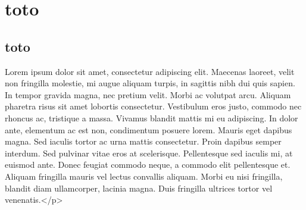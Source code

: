 \documentclass[a4paper, oneside, notitlepage, 12pt]{article}
\title{}
\date{}
\author{}
\begin{document}
\makeatletter
\def\toto#1{\subsection{#1}}
\def\@sect#1#2#3#4#5#6[#7]#8{%
  \let\edtext=\dummy@edtext\ifnum #2>\c@secnumdepth
    \let\@svsec\@empty
  \else
    \refstepcounter{#1}%
    \protected@edef\@svsec{\@seccntformat{#1}\relax}%
  \fi
  \@tempskipa #5\relax
  \ifdim \@tempskipa>\z@
    \begingroup
      #6{%
        \@hangfrom{\hskip #3\global\advance\line@num 1\llap{\leftlinenum} \relax\@svsec}%
          \interlinepenalty \@M #8\@@par}%
    \endgroup
    \csname #1mark\endcsname{#7}%
    \addcontentsline{toc}{#1}{%
      \ifnum #2>\c@secnumdepth \else
        \protect\numberline{\csname the#1\endcsname}%
      \fi
      #7}%
  \else
    \def\@svsechd{%
      #6{\hskip #3\relax
      \@svsec #8}%
      \csname #1mark\endcsname{#7}%
      \addcontentsline{toc}{#1}{%
        \ifnum #2>\c@secnumdepth \else
          \protect\numberline{\csname the#1\endcsname}%
        \fi
        #7}}%
  \fi
  \@xsect{#5}}

\beginnumbering

\pstart

\section{toto}
\subsection{toto}
Lorem ipsum dolor sit amet, consectetur adipiscing elit. Maecenas laoreet, velit non fringilla molestie, mi augue aliquam turpis, in sagittis nibh dui quis sapien. In tempor gravida magna, nec pretium velit. Morbi ac volutpat arcu. Aliquam pharetra risus sit amet lobortis consectetur. Vestibulum eros justo, commodo nec rhoncus ac, tristique a massa. Vivamus blandit mattis mi eu adipiscing. In dolor ante, elementum ac est non, condimentum posuere lorem. Mauris eget dapibus magna. Sed iaculis tortor ac urna mattis consectetur. Proin dapibus semper interdum. Sed pulvinar vitae eros at scelerisque. Pellentesque sed iaculis mi, at euismod ante. Donec feugiat commodo neque, a commodo elit pellentesque et. Aliquam fringilla mauris vel lectus convallis aliquam. Morbi eu nisi fringilla, blandit diam ullamcorper, lacinia magna. Duis fringilla ultrices tortor vel venenatis.</p> 
\pend
\endnumbering
\end{document}
